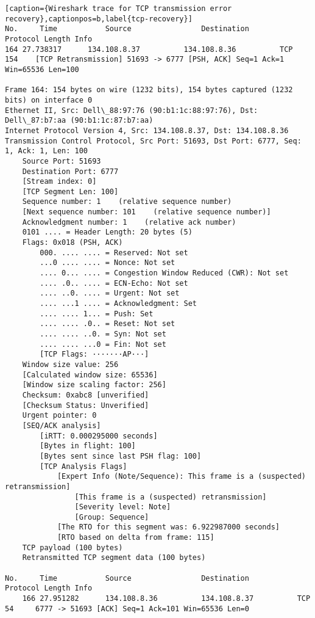 \begin{lstlisting}[caption={Wireshark trace for TCP transmission error recovery},captionpos=b,label{tcp-recovery}]
No.     Time           Source                Destination           Protocol Length Info
164 27.738317      134.108.8.37          134.108.8.36          TCP      154    [TCP Retransmission] 51693 -> 6777 [PSH, ACK] Seq=1 Ack=1 Win=65536 Len=100

Frame 164: 154 bytes on wire (1232 bits), 154 bytes captured (1232 bits) on interface 0
Ethernet II, Src: Dell\_88:97:76 (90:b1:1c:88:97:76), Dst: Dell\_87:b7:aa (90:b1:1c:87:b7:aa)
Internet Protocol Version 4, Src: 134.108.8.37, Dst: 134.108.8.36
Transmission Control Protocol, Src Port: 51693, Dst Port: 6777, Seq: 1, Ack: 1, Len: 100
	Source Port: 51693
	Destination Port: 6777
	[Stream index: 0]
	[TCP Segment Len: 100]
	Sequence number: 1    (relative sequence number)
	[Next sequence number: 101    (relative sequence number)]
	Acknowledgment number: 1    (relative ack number)
	0101 .... = Header Length: 20 bytes (5)
	Flags: 0x018 (PSH, ACK)
		000. .... .... = Reserved: Not set
		...0 .... .... = Nonce: Not set
		.... 0... .... = Congestion Window Reduced (CWR): Not set
		.... .0.. .... = ECN-Echo: Not set
		.... ..0. .... = Urgent: Not set
		.... ...1 .... = Acknowledgment: Set
		.... .... 1... = Push: Set
		.... .... .0.. = Reset: Not set
		.... .... ..0. = Syn: Not set
		.... .... ...0 = Fin: Not set
		[TCP Flags: ·······AP···]
	Window size value: 256
	[Calculated window size: 65536]
	[Window size scaling factor: 256]
	Checksum: 0xabc8 [unverified]
	[Checksum Status: Unverified]
	Urgent pointer: 0
	[SEQ/ACK analysis]
		[iRTT: 0.000295000 seconds]
		[Bytes in flight: 100]
		[Bytes sent since last PSH flag: 100]
		[TCP Analysis Flags]
			[Expert Info (Note/Sequence): This frame is a (suspected) retransmission]
				[This frame is a (suspected) retransmission]
				[Severity level: Note]
				[Group: Sequence]
			[The RTO for this segment was: 6.922987000 seconds]
			[RTO based on delta from frame: 115]
	TCP payload (100 bytes)
	Retransmitted TCP segment data (100 bytes)

No.     Time           Source                Destination           Protocol Length Info
	166 27.951282      134.108.8.36          134.108.8.37          TCP      54     6777 -> 51693 [ACK] Seq=1 Ack=101 Win=65536 Len=0


\end{lstlisting}
